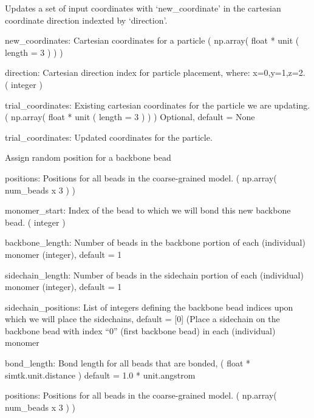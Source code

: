 \documentclass[letterpaper,12pt,english,openany,twoside]{sphinxmanual}
\begin{document}
\begin{fulllineitems}
\label{\detokenize{util:util.append_position}}
Updates a set of input coordinates with ‘new\_coordinate’ in the
cartesian coordinate direction indexted by ‘direction’.

new\_coordinates: Cartesian coordinates for a particle
( np.array( float * unit ( length = 3 ) ) )

direction: Cartesian direction index for particle placement, 
where: x=0,y=1,z=2. 
( integer )

trial\_coordinates: Existing cartesian coordinates for the particle
we are updating.
( np.array( float * unit ( length = 3 ) ) )
Optional, default = None

trial\_coordinates: Updated coordinates for the particle.

\end{fulllineitems}


\begin{fulllineitems}
\label{\detokenize{util:util.assign_backbone_beads}}
Assign random position for a backbone bead

positions: Positions for all beads in the coarse-grained model.
( np.array( num\_beads x 3 ) )

monomer\_start: Index of the bead to which we will bond this
new backbone bead.
( integer )

backbone\_length: Number of beads in the backbone
portion of each (individual) monomer (integer), default = 1

sidechain\_length: Number of beads in the sidechain
portion of each (individual) monomer (integer), default = 1

sidechain\_positions: List of integers defining the backbone
bead indices upon which we will place the sidechains,
default = {[}0{]} (Place a sidechain on the backbone bead with
index “0” (first backbone bead) in each (individual) monomer

bond\_length: Bond length for all beads that are bonded,
( float * simtk.unit.distance )
default = 1.0 * unit.angstrom

positions: Positions for all beads in the coarse-grained model.
( np.array( num\_beads x 3 ) )

\end{fulllineitems}
\end{document}
